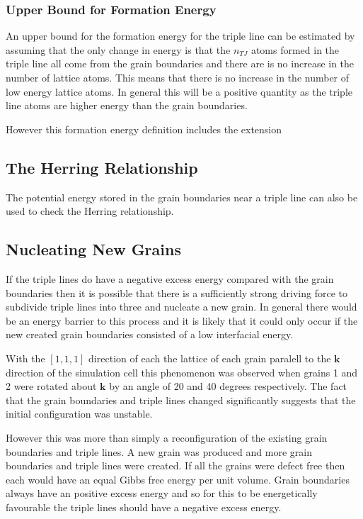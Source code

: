\documentclass[12pt,a4paper]{book}
\begin{document}
\subsubsection{Upper Bound for Formation Energy}

An upper bound for the formation energy for the triple line can be estimated by assuming that the only change in energy is that the  $n_{TJ}$ atoms formed in the triple line all come from the grain boundaries and there are is no increase in the number of lattice atoms. This means that there is no increase in the number of low energy lattice atoms. In general this will be a positive quantity as the triple line atoms are higher energy than the grain boundaries. 

However this formation energy definition includes the extension  


\subsection{The Herring Relationship}

The potential energy stored in the grain boundaries near a triple line can also be used to check the Herring relationship.

\subsection{Nucleating New Grains}

If the triple lines do have a negative excess energy compared with the grain boundaries then it is possible that there is a sufficiently strong driving force to subdivide triple lines into three and nucleate a new grain. In general there would be an energy barrier to this process and it is likely that it could only occur if the new created grain boundaries consisted of a low interfacial energy.

With the $[1,1,1]$ direction of each the lattice of each grain paralell to the $\mathbf{k}$ direction of the simulation cell this phenomenon was observed when grains 1 and 2 were rotated about $\mathbf{k}$  by an angle of 20 and 40 degrees respectively. The fact that the grain boundaries and triple lines changed significantly suggests that the initial configuration was unstable. 

However this was more than simply a reconfiguration of the existing grain boundaries and triple lines. A new grain was produced and more grain boundaries and triple lines were created. If all the grains were defect free then each would have an equal Gibbs free energy per unit volume. Grain boundaries always have an positive excess energy and so for this to be energetically favourable the triple lines should have a negative excess energy.
\end{document}
